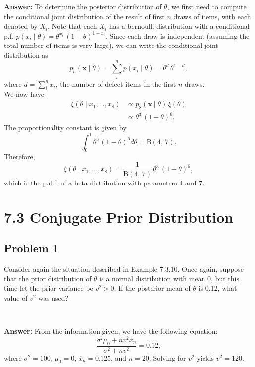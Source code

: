 \documentclass{article}
\begin{document}
\textbf{Answer:} To determine the posterior distribution of $\theta$, we first need to compute the conditional joint distribution of the result of first $n$ draws of items, with each denoted by $X_i$. Note that each $X_i$ has a bernoulli distribution with a conditional p.f. $p(x_i \mid \theta) = \theta^{x_i} \, (1 - \theta)^{1-x_i}$. Since each draw is independent (assuming the total number of items is very large), we can write the conditional joint distribution as 
\begin{equation*}
p_n(\boldsymbol{x} \mid \theta) = \sum_i^n p(x_i \mid \theta) = \theta^{d} \, \theta^{1-d},
\end{equation*}
where $d = \sum_i^n x_i$, the number of defect items in the first $n$ draws.\\
We now have 
\begin{align*}
\xi(\theta \mid x_1,\dots,x_8) &\propto p_8(\boldsymbol{x} \mid \theta) \, \xi(\theta) \\
& \propto \theta^3 \, (1 - \theta)^6.
\end{align*}
The proportionality constant is given by
\begin{equation*}
\int_0^1 \theta^3 \, (1 - \theta)^6 d \theta = \text{B}(4,\,7).
\end{equation*}
Therefore,
\begin{equation*}
\xi(\theta \mid x_1,\dots,x_8) = \frac{1}{\text{B}(4,\,7)} \, \theta^3 \, (1 - \theta)^6,
\end{equation*}
which is the p.d.f. of a beta distribution with parameters 4 and 7.

\newpage
\section*{7.3 Conjugate Prior Distribution}

\subsection*{Problem 1}
Consider again the situation described in Example 7.3.10. Once again, suppose that the prior distribution of $\theta$ is a normal distribution with mean 0, but this time let the prior variance be $v^2 > 0$. If the posterior mean of $\theta$ is 0.12, what value of $v^2$ was used?

\

\textbf{Answer:} From the information given, we have the following equation:
\begin{equation*}
\frac{\sigma^2 \mu_0 + n v^2 \overline{x}_n}{\sigma^2 + n v^2} = 0.12,
\end{equation*}
where $\sigma^2 = 100$, $\mu_0 = 0$, $\overline{x}_n = 0.125$, and $n = 20$. Solving for $v^2$ yields $v^2 = 120$.
\end{document}
